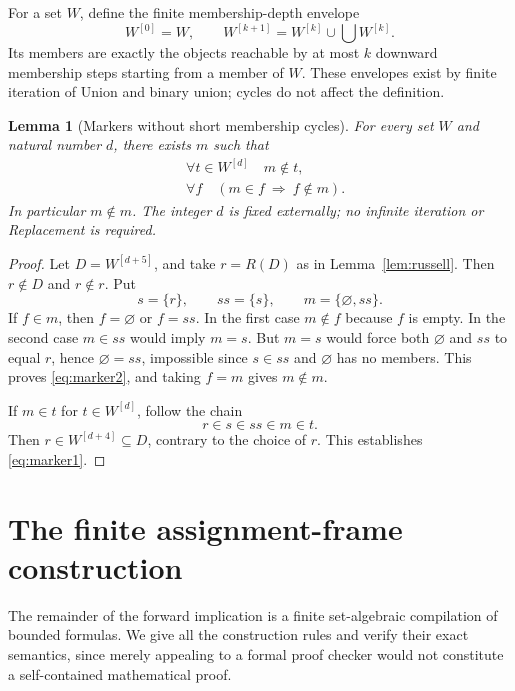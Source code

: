 \documentclass[11pt,a4paper]{article}
\numberwithin{equation}{section}
\newtheorem{lemma}[theorem]{Lemma}
\begin{document}
For a set $W$, define the finite membership-depth envelope
\begin{equation}\label{eq:depth}
W^{[0]}=W,\qquad W^{[k+1]}=W^{[k]}\cup\bigcup W^{[k]}.
\end{equation}
Its members are exactly the objects reachable by at most $k$ downward membership steps starting from a member of $W$.  These envelopes exist by finite iteration of Union and binary union; cycles do not affect the definition.

\begin{lemma}[Markers without short membership cycles]\label{lem:marker}
For every set $W$ and natural number $d$, there exists $m$ such that
\begin{align}
&\forall t\in W^{[d]}\quad m\notin t,\label{eq:marker1}\\
&\forall f\quad (m\in f\ \Longrightarrow\ f\notin m).\label{eq:marker2}
\end{align}
In particular $m\notin m$.  The integer $d$ is fixed externally; no infinite iteration or Replacement is required.
\end{lemma}
\begin{proof}
Let $D=W^{[d+5]}$, and take $r=R(D)$ as in Lemma~\ref{lem:russell}.  Then $r\notin D$ and $r\notin r$.  Put
\[
s=\{r\},\qquad ss=\{s\},\qquad m=\{\varnothing,ss\}.
\]
If $f\in m$, then $f=\varnothing$ or $f=ss$.  In the first case $m\notin f$ because $f$ is empty.  In the second case $m\in ss$ would imply $m=s$.  But $m=s$ would force both $\varnothing$ and $ss$ to equal $r$, hence $\varnothing=ss$, impossible since $s\in ss$ and $\varnothing$ has no members.  This proves \eqref{eq:marker2}, and taking $f=m$ gives $m\notin m$.

If $m\in t$ for $t\in W^{[d]}$, follow the chain
\[
r\in s\in ss\in m\in t.
\]
Then $r\in W^{[d+4]}\subseteq D$, contrary to the choice of $r$.  This establishes \eqref{eq:marker1}.
\end{proof}

\section{The finite assignment-frame construction}\label{sec:finite}
The remainder of the forward implication is a finite set-algebraic compilation of bounded formulas.  We give all the construction rules and verify their exact semantics, since merely appealing to a formal proof checker would not constitute a self-contained mathematical proof.
\end{document}

